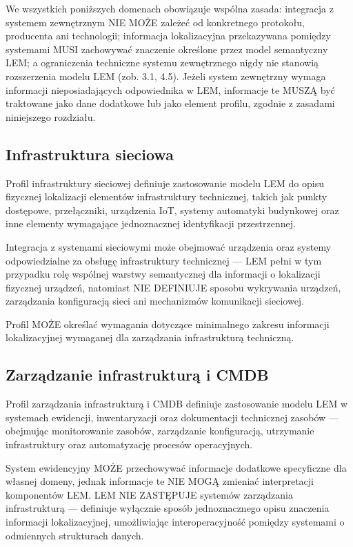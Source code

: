 We wszystkich poniższych domenach obowiązuje wspólna zasada: integracja z systemem zewnętrznym NIE MOŻE zależeć od konkretnego protokołu, producenta ani technologii; informacja lokalizacyjna przekazywana pomiędzy systemami MUSI zachowywać znaczenie określone przez model semantyczny LEM; a ograniczenia techniczne systemu zewnętrznego nigdy nie stanowią rozszerzenia modelu LEM (zob. 3.1, 4.5). Jeżeli system zewnętrzny wymaga informacji nieposiadających odpowiednika w LEM, informacje te MUSZĄ być traktowane jako dane dodatkowe lub jako element profilu, zgodnie z zasadami niniejszego rozdziału.

\subsection{Infrastruktura sieciowa}
Profil infrastruktury sieciowej definiuje zastosowanie modelu LEM do opisu fizycznej lokalizacji elementów infrastruktury technicznej, takich jak punkty dostępowe, przełączniki, urządzenia IoT, systemy automatyki budynkowej oraz inne elementy wymagające jednoznacznej identyfikacji przestrzennej.

Integracja z systemami sieciowymi może obejmować urządzenia oraz systemy odpowiedzialne za obsługę infrastruktury technicznej — LEM pełni w tym przypadku rolę wspólnej warstwy semantycznej dla informacji o lokalizacji fizycznej urządzeń, natomiast NIE DEFINIUJE sposobu wykrywania urządzeń, zarządzania konfiguracją sieci ani mechanizmów komunikacji sieciowej.

Profil MOŻE określać wymagania dotyczące minimalnego zakresu informacji lokalizacyjnej wymaganej dla zarządzania infrastrukturą techniczną.

\subsection{Zarządzanie infrastrukturą i CMDB}
Profil zarządzania infrastrukturą i CMDB definiuje zastosowanie modelu LEM w systemach ewidencji, inwentaryzacji oraz dokumentacji technicznej zasobów — obejmując monitorowanie zasobów, zarządzanie konfiguracją, utrzymanie infrastruktury oraz automatyzację procesów operacyjnych.

System ewidencyjny MOŻE przechowywać informacje dodatkowe specyficzne dla własnej domeny, jednak informacje te NIE MOGĄ zmieniać interpretacji komponentów LEM. LEM NIE ZASTĘPUJE systemów zarządzania infrastrukturą — definiuje wyłącznie sposób jednoznacznego opisu znaczenia informacji lokalizacyjnej, umożliwiając interoperacyjność pomiędzy systemami o odmiennych strukturach danych.

